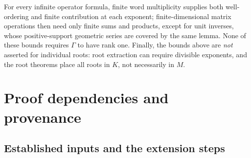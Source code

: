 \documentclass[11pt,letterpaper]{article}
\theoremstyle{definition}
\theoremstyle{remark}
\numberwithin{equation}{section}
\begin{document}
For every infinite operator formula, finite word multiplicity supplies both well-ordering and finite contribution at each exponent; finite-dimensional matrix operations then need only finite sums and products, except for unit inverses, whose positive-support geometric series are covered by the same lemma. None of these bounds requires $\Gamma$ to have rank one. Finally, the bounds above are \emph{not} asserted for individual roots: root extraction can require divisible exponents, and the root theorems place all roots in $K$, not necessarily in $M$.

\section{Proof dependencies and provenance}
\label{finite:app:audit}

\subsection{Established inputs and the extension steps}
\end{document}
